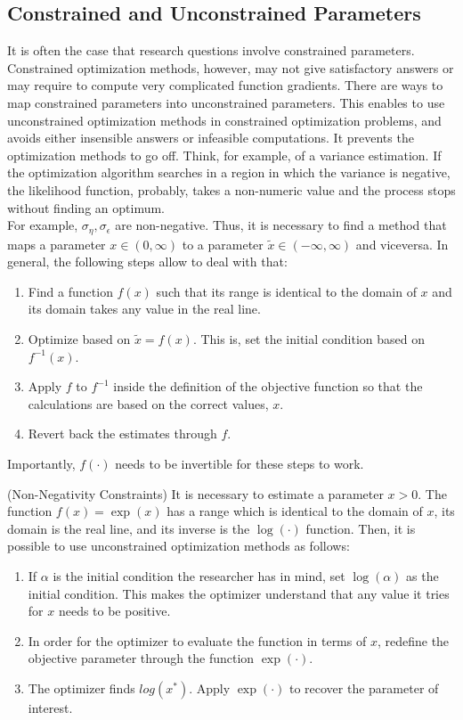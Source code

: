 \subsection{Constrained and Unconstrained Parameters} \label{conopt}
\noindent It is often the case that research questions involve constrained parameters. Constrained optimization methods, however, may not give satisfactory answers or may require to compute very complicated function gradients. There are ways to map constrained parameters into unconstrained parameters. This enables to use unconstrained optimization methods in constrained optimization problems, and avoids either insensible answers or infeasible computations. It prevents the optimization methods to go off. Think, for example, of a variance estimation. If the optimization algorithm searches in a region in which the variance is negative, the likelihood function, probably, takes a non-numeric value and the process stops without finding an optimum.\\
\indent For example, $\sigma_{\eta},\sigma_{\epsilon}$ are non-negative. Thus, it is necessary to find a method that maps a parameter $x \in (0,\infty)$ to a parameter $\tilde{x} \in (-\infty,\infty)$ and viceversa. In general, the following steps allow to deal with that:
\begin{enumerate}
\item Find a function $f(x)$ such that its range is identical to the domain of $x$ and its domain takes any value in the real line. 
\item Optimize based on $\tilde{x} = f(x)$. This is, set the initial condition based on $f^{-1}(x)$. 
\item Apply $f$ to $f^{-1}$ inside the definition of the objective function so that the calculations are based on the correct values, $x$.
\item Revert back the estimates through $f$.  
\end{enumerate}
\noindent Importantly, $f(\cdot)$ needs to be invertible for these steps to work.
\begin{example} (Non-Negativity Constraints) \label{ex:noneg}
It is necessary to estimate a parameter $x > 0$. The function $f(x) = \exp(x)$ has a range which is identical to the domain of $x$, its domain is the real line, and its inverse is the $\log(\cdot)$ function. Then, it is possible to use unconstrained optimization methods as follows:
\begin{enumerate}
\item If $\alpha$ is the initial condition the researcher has in mind, set $\log(\alpha)$ as the initial condition. This makes the optimizer understand that any value it tries for $x$ needs to be positive.
\item In order for the optimizer to evaluate the function in terms of $x$, redefine the objective parameter through the function $\exp(\cdot)$.
\item The optimizer finds $log(x^*)$. Apply $\exp(\cdot)$ to recover the parameter of interest.
\end{enumerate}
\end{example}

